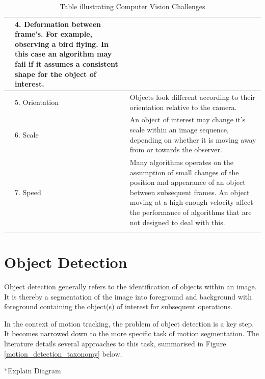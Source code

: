 \begin{longtable}{ p{}  p{}  p{} }
    &
    4. Deformation
    between frame's. For example, observing a bird flying. In this
    case an algorithm may fail if it assumes a consistent shape for
    the object of interest.
    \\ \bottomrule

    &
    5. Orientation
    &
    Objects look different according to their orientation relative
    to the camera.
    \\ \bottomrule

    &
    6. Scale
    &
    An object of interest may change it's scale within an image
    sequence, depending on whether it is moving away from or towards
    the observer.
    \\ \bottomrule

    &
    7. Speed 
    &
    Many algorithms operates on the assumption of small
    changes of the position and appearance of an object between
    subsequent frames. An object moving at a high enough velocity
    affect the performance of algorithms that are not designed to
    deal with this.
    \\ \bottomrule
    \caption{Table illustrating Computer Vision Challenges}
    \label{table_computer_vision_challenges}
\end{longtable}

\section{Object Detection}
Object detection generally refers to the identification of objects within
an image. It is thereby a segmentation of the image into foreground
and background with foreground containing the object(s) of interest for subsequent
operations.

In the context of motion tracking, the problem of object detection is a key
step. It becomes narrowed down to the more specific task of motion segmentation.
The literature details several approaches to this task, summarised in 
Figure \ref{motion_detection_taxonomy} below.


*Explain Diagram

